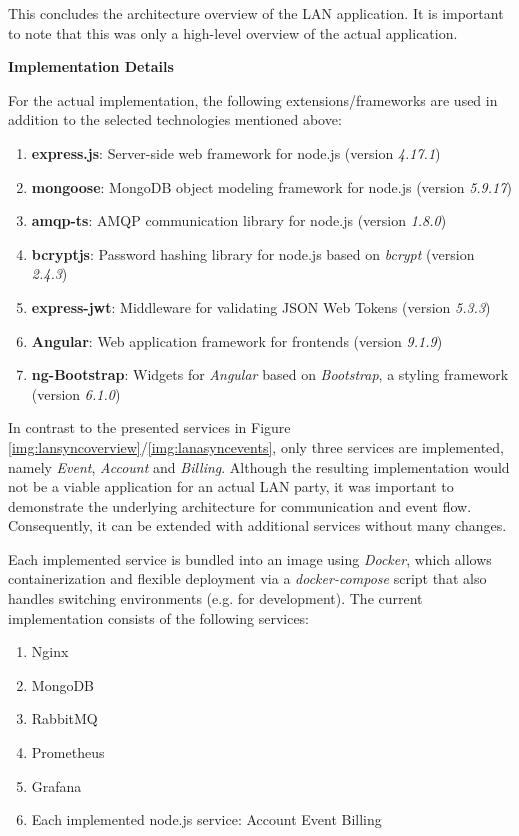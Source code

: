 This concludes the architecture overview of the \ac{LAN} application.
It is important to note that this was only a high-level overview of the actual application.

\textbf{Implementation Details}

For the actual implementation, the following extensions/frameworks are used in addition to the selected technologies mentioned above:

\begin{enumerate}
	\item \textbf{express.js}: Server-side web framework for node.js (version \textit{4.17.1})
	\item \textbf{mongoose}: MongoDB object modeling framework for node.js (version \textit{5.9.17})
	\item \textbf{amqp-ts}: \ac{AMQP} communication library for node.js (version \textit{1.8.0})
	\item \textbf{bcryptjs}: Password hashing library for node.js based on \textit{bcrypt} (version \textit{2.4.3})
	\item \textbf{express-jwt}: Middleware for validating \ac{JSON} Web Tokens (version \textit{5.3.3})
	\item \textbf{Angular}: Web application framework for frontends (version \textit{9.1.9})
	\item \textbf{ng-Bootstrap}: Widgets for \textit{Angular} based on \textit{Bootstrap}, a styling framework (version \textit{6.1.0})
\end{enumerate}

In contrast to the presented services in Figure \ref{img:lansyncoverview}/\ref{img:lanasyncevents}, only three services are implemented, namely \textit{Event},\textit{ Account} and \textit{Billing}.
Although the resulting implementation would not be a viable application for an actual LAN party, it was important to demonstrate the underlying architecture for communication and event flow.
Consequently, it can be extended with additional services without many changes.

Each implemented service is bundled into an image using \textit{Docker}, which allows containerization and flexible deployment via a \textit{docker-compose} script that also handles switching environments (e.g. for development).
The current implementation consists of the following services:
\begin{enumerate}
	\item Nginx
	\item MongoDB
	\item RabbitMQ
	\item Prometheus
	\item Grafana
	\item Each implemented node.js service:
	      \subitem Account
	      \subitem Event
	      \subitem Billing
\end{enumerate}

